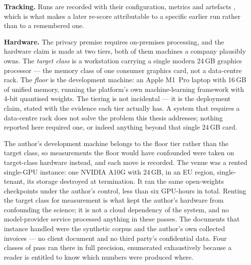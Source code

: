 \textbf{Tracking.} Runs are recorded with their configuration, metrics and artefacts
\parencite{mlflow}, which is what makes a later re-score attributable to a specific earlier run
rather than to a remembered one.

\textbf{Hardware.} The privacy premise requires on-premises processing, and the hardware claim
is made at two tiers, both of them machines a company plausibly owns. The \emph{target class} is
a workstation carrying a single modern 24\,\ac{GB} graphics processor --- the memory class of
one consumer graphics card, not a data-centre rack. The \emph{floor} is the development
machine: an Apple M1~Pro laptop with 16\,\ac{GB} of unified memory, running the platform's own
machine-learning framework \parencite{mlxvlm} with 4-bit quantised weights. The tiering is not
incidental --- it is the deployment claim, stated with the evidence each tier actually has. A
system that requires a data-centre rack does not solve the problem this thesis addresses;
nothing reported here required one, or indeed anything beyond that single 24\,\ac{GB} card.

The author's development machine belongs to the floor tier rather than the target class, so
measurements the floor would have confounded were taken on target-class hardware instead, and
each move is recorded. The venue was a rented single-\ac{GPU} instance: one NVIDIA A10G with
24\,\ac{GB}, in an \ac{EU} region, single-tenant, its storage destroyed at termination.
It ran the same open-weights checkpoints under the author's control, less than six
\ac{GPU}-hours in total. Renting the target class for measurement is what kept the author's
hardware from confounding the science; it is not a cloud dependency of the system, and no
model-provider service processed anything in these passes. The documents that instance handled were the
synthetic corpus and the author's own collected invoices --- no client document and no third
party's confidential data. Four classes of pass ran there in full precision, enumerated
exhaustively because a reader is entitled to know which numbers were produced where.
\label{acro:CUDA}%

